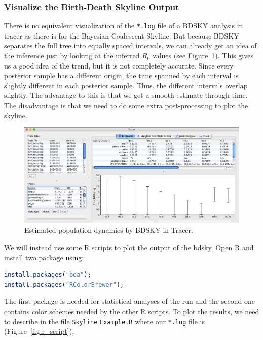 \documentclass[11pt]{article}
\begin{document}
\subsubsection{Visualize the Birth-Death Skyline Output}

There is no equivalent visualization of the \texttt{*.log} file of a BDSKY analysis in tracer as there is for the Bayesian Coalescent Skyline. But because BDSKY separates the full tree into equally spaced intervals, we can already get an idea of the inference just by looking at the inferred $R_{0}$ values (see Figure~\ref{fig:bdsky_dynamics}). This gives us a good idea of the trend, but it is not completely accurate. Since every posterior sample has a different origin, the time spanned by each interval is slightly different in each posterior sample. Thus, the different intervals overlap slightly. The advantage to this is that we get a smooth estimate through time. The disadvantage is that we need to do some extra post-processing to plot the skyline.

\begin{figure}[h!]
\centering
\includegraphics[width=\textwidth]{figures/bdsky_tracer.png}
\caption{\small Estimated population dynamics by BDSKY in Tracer.}
\label{fig:bdsky_dynamics}
\end{figure}


We will instead use some R scripts to plot the output of the bdsky. 
Open R and install two package using:
\begin{lstlisting}[language=R]
install.packages("boa");
install.packages("RColorBrewer");
\end{lstlisting}

The first package is needed for statistical analyses of the run and the second one contains color schemes needed by the other R scripts. 
To plot the results, we need to describe in the file \texttt{Skyline$\_$Example.R} where our \texttt{*.log} file is (Figure~\ref{fig:r_script}).
\end{document}
